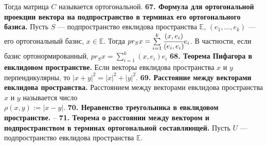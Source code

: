 \documentclass{article}
\begin{document}
Тогда матрица $C$ называется ортогональной.
\newline
\newline
\textbf{67. Формула для ортогональной проекции вектора на подпространство в терминах его ортогонального базиса.}
Пусть $S$ --- подпространство евклидова пространства $\mathbb{E}$, $(e_1, \ldots, e_k)$ --- его ортогональный базис, $x \in \mathbb{E}$.
Тогда $pr_S x = \sum\limits_{i = 1}^{k}\cfrac{(x,e_i)}{(e_i, e_i)}e_i$. В частности, если базис ортонормированный, $pr_S x = \sum\limits_{i = 1}^{k}(x,e_i)e_i$
\newline
\newline
\textbf{68. Теорема Пифагора в евклидовом пространстве.}
Если векторы евклидова пространства $x$ и $y$ перпендикулярны, то $|x+y|^2 = |x|^2 + |y|^2$.
\newline
\newline
\textbf{69. Расстояние между векторами евклидова пространства.}
Расстоянием между векторами евклидова пространства $x$ и $y$ называется число \\$\rho(x,y) := |x-y|$.
\newline
\newline
\textbf{70. Неравенство треугольника в евклидовом пространстве.}
--
\newline
\newline
\textbf{71. Теорема о расстоянии между вектором и подпространством в терминах ортогональной составляющей.}
Пусть $U$ --- подпространство евклидова пространства $\mathbb{E}$.
\end{document}
